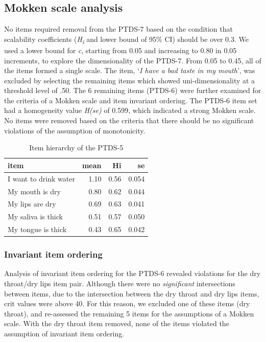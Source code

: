 \documentclass[12pt,twocolumn,twoside,]{pinp}
\begin{document}
\hypertarget{mokken-scale-analysis}{%
\subsection{Mokken scale analysis}\label{mokken-scale-analysis}}

No items required removal from the PTDS-7 based on the condition that
scalability coefficients (\emph{H\textsubscript{i}} and lower bound of
95\% CI) should be over 0.3. We used a lower bound for \emph{c},
starting from 0.05 and increasing to 0.80 in 0.05 increments, to explore
the dimensionality of the PTDS-7. From 0.05 to 0.45, all of the items
formed a single scale. The item, `\emph{I have a bad taste in my
mouth}', was excluded by selecting the remaining items which showed
uni-dimensionality at a threshold level of .50. The 6 remaining items
(PTDS-6) were further examined for the criteria of a Mokken scale and
item invariant ordering. The PTDS-6 item set had a homogeneity value
\emph{H(se)} of 0.599, which indicated a strong Mokken scale. No items
were removed based on the criteria that there should be no significant
violations of the assumption of monotonicity.

\begin{table}

\caption{\label{tab:hierarchytabpdf}Item hierarchy of the PTDS-5}
\centering
\begin{tabular}[t]{lrrr}
\toprule
item & mean & Hi & se\\
\midrule
I want to drink water & 1.10 & 0.56 & 0.054\\
My mouth is dry & 0.80 & 0.62 & 0.044\\
My lips are dry & 0.69 & 0.63 & 0.041\\
My saliva is thick & 0.51 & 0.57 & 0.050\\
My tongue is thick & 0.43 & 0.65 & 0.042\\
\bottomrule
\end{tabular}
\end{table}

\hypertarget{invariant-item-ordering}{%
\subsubsection{Invariant item ordering}\label{invariant-item-ordering}}

Analysis of invariant item ordering for the PTDS-6 revealed violations
for the dry throat/dry lips item pair. Although there were no
\emph{significant} intersections between items, due to the intersection
between the dry throat and dry lips items, crit values were above 40.
For this reason, we excluded one of these items (dry throat), and
re-assessed the remaining 5 items for the assumptions of a Mokken scale.
With the dry throat item removed, none of the items violated the
assumption of invariant item ordering.
\end{document}
